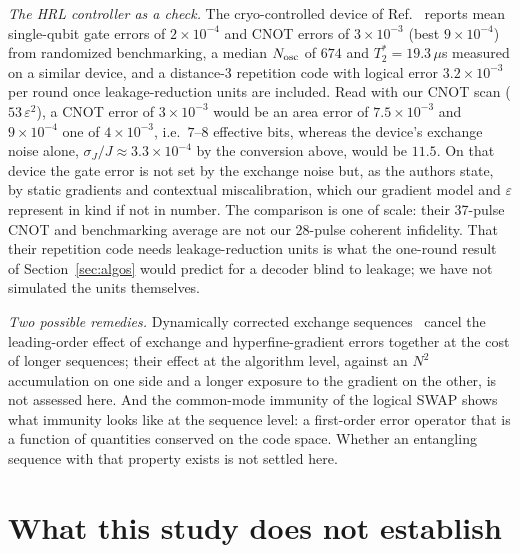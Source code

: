 \documentclass[reprint,aps,pra,amsmath,amssymb,superscriptaddress,letterpaper]{revtex4-2}
\begin{document}
\emph{The HRL controller as a check.} The cryo-controlled device of Ref.~\cite{hrl2026} reports mean single-qubit gate errors of $2\times10^{-4}$ and CNOT errors of $3\times10^{-3}$ (best $9\times10^{-4}$) from randomized benchmarking, a median $N_{\rm osc}$ of $674$ and $T_2^*=19.3\,\mu$s measured on a similar device, and a distance-3 repetition code with logical error $3.2\times10^{-3}$ per round once leakage-reduction units are included. Read with our CNOT scan ($53\,\varepsilon^2$), a CNOT error of $3\times10^{-3}$ would be an area error of $7.5\times10^{-3}$ and $9\times10^{-4}$ one of $4\times10^{-3}$, i.e.\ $7$--$8$ effective bits, whereas the device's exchange noise alone, $\sigma_J/J\approx3.3\times10^{-4}$ by the conversion above, would be $11.5$. On that device the gate error is not set by the exchange noise but, as the authors state, by static gradients and contextual miscalibration, which our gradient model and $\varepsilon$ represent in kind if not in number. The comparison is one of scale: their 37-pulse CNOT and benchmarking average are not our 28-pulse coherent infidelity. That their repetition code needs leakage-reduction units is what the one-round result of Section~\ref{sec:algos} would predict for a decoder blind to leakage; we have not simulated the units themselves.

\emph{Two possible remedies.} Dynamically corrected exchange sequences~\cite{hickman2013} cancel the leading-order effect of exchange and hyperfine-gradient errors together at the cost of longer sequences; their effect at the algorithm level, against an $N^2$ accumulation on one side and a longer exposure to the gradient on the other, is not assessed here.
And the common-mode immunity of the logical SWAP shows what immunity looks
like at the sequence level: a first-order error operator that is a function
of quantities conserved on the code space. Whether an entangling sequence
with that property exists is not settled here.

\section{What this study does not establish}
\label{sec:limits}
\end{document}
